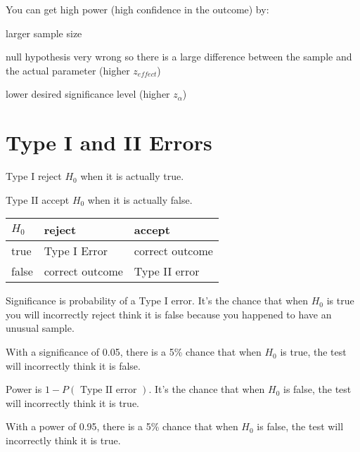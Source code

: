 \documentclass[letterpaper, landscape]{exam}
\begin{document}
  You can get high power (high confidence in the outcome) by:
  \begin{itemize*}
    \item larger sample size
    \item null hypothesis very wrong so there is a large difference between the
      sample and the actual parameter (higher $z_{effect}$)
    \item lower desired significance level (higher $z_{\alpha}$)
  \end{itemize*}

  \pagebreak

  \section{Type I and II Errors}

  \begin{description*}
    \item[Type I] reject $H_0$ when it is actually true.
    \item[Type II] accept $H_0$ when it is actually false.
  \end{description*}

  \begin{tabular}[H]{lll}
    \toprule
    $H_0$ & reject          & accept \\
    \midrule
    true  & Type I Error    & correct outcome \\
    false & correct outcome & Type II error \\
    \bottomrule
  \end{tabular}

  Significance is probability of a Type I error. It's the chance that when
  $H_0$ is true you will incorrectly reject think it is false because you
  happened to have an unusual sample.
  
  With a significance of 0.05, there is a 5\% chance that when $H_0$ is true,
  the test will incorrectly think it is false.

  Power is $1 - P(\text{ Type II error })$. It's the chance that when $H_0$ is
  false, the test will incorrectly think it is true. 

  With a power of 0.95, there is a 5\% chance that when $H_0$ is false, the test
  will incorrectly think it is true.

\end{document}
